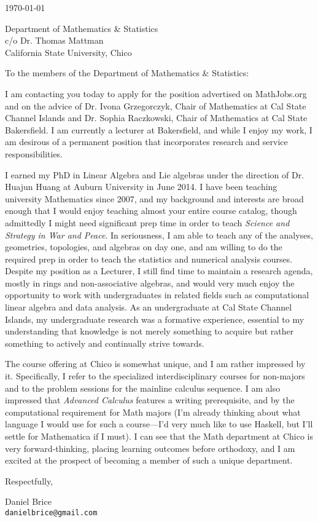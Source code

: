 \documentclass[11pt]{article}
\begin{document}
\makeletterhead{}

\vfill

\today

\vfill

Department of Mathematics \& Statistics\\
c/o Dr. Thomas Mattman\\
California State University, Chico

\vfill

To the members of the Department of Mathematics \& Statistics:

\vfill

I am contacting you today to apply for the position advertised on
MathJobs.org and on the advice of Dr. Ivona Grzegorczyk, Chair of
Mathematics at Cal State Channel Islands and Dr. Sophia Raczkowski,
Chair of Mathematics at Cal State Bakersfield. I am currently a lecturer
at Bakersfield, and while I enjoy my work, I am desirous of a permanent
position that incorporates research and service responsibilities.

I earned my PhD in Linear Algebra and Lie algebras under the direction
of Dr. Huajun Huang at Auburn University in June 2014. I have been
teaching university Mathematics since 2007, and my background and
interests are broad enough that I would enjoy teaching almost your
entire course catalog, though admittedly I might need significant prep
time in order to teach \emph{Science and Strategy in War and Peace}. In
seriousness, I am able to teach any of the analyses, geometries,
topologies, and algebras on day one, and am willing to do the required
prep in order to teach the statistics and numerical analysis courses.
Despite my position as a Lecturer, I still find time to maintain a
research agenda, mostly in rings and non-associative algebras, and would
very much enjoy the opportunity to work with undergraduates in related
fields such as computational linear algebra and data analysis. As an
undergraduate at Cal State Channel Islands, my undergraduate research
was a formative experience, essential to my understanding that knowledge
is not merely something to acquire but rather something to actively and
continually strive towards.

The course offering at Chico is somewhat unique, and I am rather
impressed by it. Specifically, I refer to the specialized
interdisciplinary courses for non-majors and to the problem sessions for
the mainline calculus sequence. I am also impressed that \emph{Advanced
Calculus} features a writing prerequisite, and by the computational
requirement for Math majors (I'm already thinking about what language I
would use for such a course---I'd very much like to use Haskell, but
I'll settle for Mathematica if I must). I can see that the Math
department at Chico is very forward-thinking, placing learning outcomes
before orthodoxy, and I am excited at the prospect of becoming a member
of such a unique department.

\vfill

Respectfully,

\vfill

Daniel Brice\\
\texttt{danielbrice@gmail.com}

\label{page:last}
\end{document}
